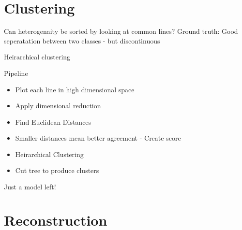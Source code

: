 \documentclass[t, 11pt, xcolor=dvipsnames]{beamer}
\begin{document}
\section{Clustering}
\begin{frame}{Can heterogenaity be sorted by looking at common lines?}
  Ground truth: Good seperatation between two classes - but discontinuous

\end{frame}

\begin{frame}{Heirarchical clustering}
\end{frame}

\begin{frame}[fragile]{Pipeline}
    \begin{itemize}
    \item Plot each line in high dimensional space %
    \item Apply dimensional reduction %
    \item Find Euclidean Distances 
    \item Smaller distances mean better agreement - Create score
    \item Heirarchical Clustering
    \item Cut tree to produce clusters
    \end{itemize}

    \pause
    Just a model left!
\end{frame}

\section{Reconstruction}
\end{document}
